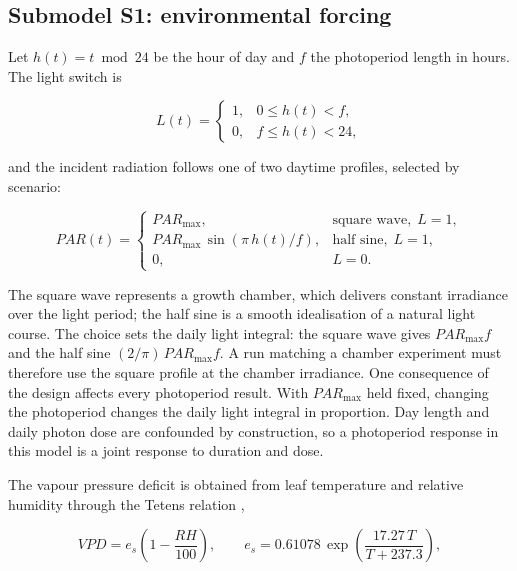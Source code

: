 \subsection{Submodel S1: environmental forcing}
\label{sec:forcing}

Let $h(t) = t \bmod 24$ be the hour of day and $f$ the photoperiod length in
hours. The light switch is

\begin{equation}
L(t) =
\begin{cases}
1, & 0 \leq h(t) < f, \\
0, & f \leq h(t) < 24 ,
\end{cases}
\label{eq:photoperiod}
\end{equation}

and the incident radiation follows one of two daytime profiles, selected by
scenario:

\begin{equation}
\mathit{PAR}(t) =
\begin{cases}
\mathit{PAR}_{\max}, & \text{square wave},\; L=1, \\[4pt]
\mathit{PAR}_{\max}\,\sin\!\left(\pi\,h(t)/f\right), & \text{half sine},\; L=1, \\[4pt]
0, & L=0 .
\end{cases}
\label{eq:par_profile}
\end{equation}

The square wave represents a growth chamber, which delivers constant irradiance
over the light period; the half sine is a smooth idealisation of a natural light
course. The choice sets the daily light integral: the square wave gives
$\mathit{PAR}_{\max} f$ and the half sine $(2/\pi)\,\mathit{PAR}_{\max} f$. A run
matching a chamber experiment must therefore use the square profile at the
chamber irradiance. One consequence of the design affects every photoperiod
result. With $\mathit{PAR}_{\max}$ held fixed, changing the photoperiod changes
the daily light integral in proportion. Day length and daily photon dose are
confounded by construction, so a photoperiod response in this model is a joint
response to duration and dose.

The vapour pressure deficit is obtained from leaf temperature and relative
humidity through the Tetens relation \citep{Monteith1965,Nobel2009},

\begin{equation}
\mathit{VPD} = e_s\left(1 - \frac{\mathit{RH}}{100}\right),
\qquad
e_s = 0.61078\,\exp\!\left(\frac{17.27\,T}{T + 237.3}\right),
\label{eq:vpd}
\end{equation}

